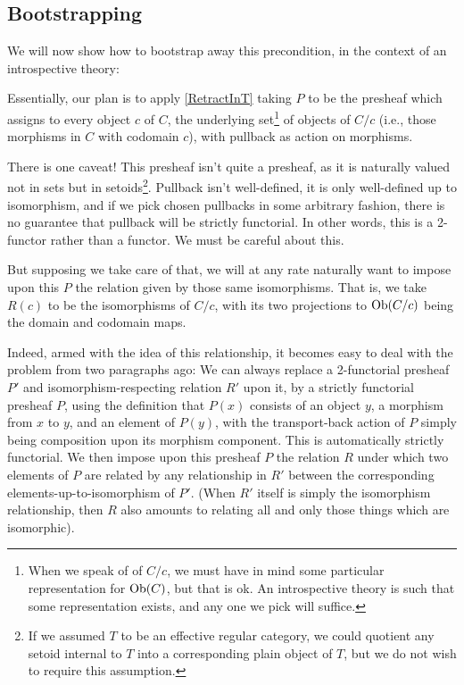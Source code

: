 \subsection{Bootstrapping}
We will now show how to bootstrap away this precondition, in the context of an introspective theory:

Essentially, our plan is to apply \cref{RetractInT} taking $P$ to be the presheaf which assigns to every object $c$ of $C$, the underlying set\footnote{When we speak of  of $C/c$, we must have in mind some particular representation for $\operatorname{Ob}(C)$, but that is ok. An introspective theory is such that some representation exists, and any one we pick will suffice.} of objects of $C/c$ (i.e., those morphisms in $C$ with codomain $c$), with pullback as action on morphisms.

There is one caveat! This presheaf isn't quite a presheaf, as it is naturally valued not in sets but in setoids\footnote{If we assumed $T$ to be an effective regular category, we could quotient any setoid internal to $T$ into a corresponding plain object of $T$, but we do not wish to require this assumption.}. Pullback isn't well-defined, it is only well-defined up to isomorphism, and if we pick chosen pullbacks in some arbitrary fashion, there is no guarantee that pullback will be strictly functorial. In other words, this is a 2-functor rather than a functor. We must be careful about this.

But supposing we take care of that, we will at any rate naturally want to impose upon this $P$ the relation given by those same isomorphisms. That is, we take $R(c)$ to be the isomorphisms of $C/c$, with its two projections to $\operatorname{Ob}(C/c)$ being the domain and codomain maps.

Indeed, armed with the idea of this relationship, it becomes easy to deal with the problem from two paragraphs ago: We can always replace a 2-functorial presheaf $P'$ and isomorphism-respecting relation $R'$ upon it, by a strictly functorial presheaf $P$, using the definition that $P(x)$ consists of an object $y$, a morphism from $x$ to $y$, and an element of $P(y)$, with the transport-back action of $P$ simply being composition upon its morphism component. This is automatically strictly functorial. We then impose upon this presheaf $P$ the relation $R$ under which two elements of $P$ are related by any relationship in $R'$ between the corresponding elements-up-to-isomorphism of $P'$. (When $R'$ itself is simply the isomorphism relationship, then $R$ also amounts to relating all and only those things which are isomorphic). 

